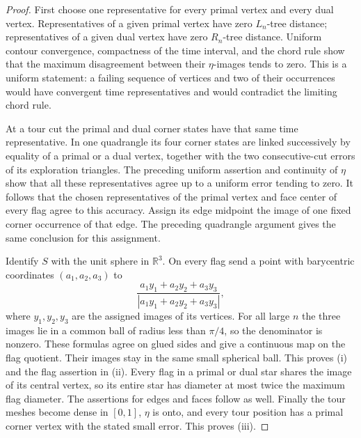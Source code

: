 \documentclass[11pt]{article}
\numberwithin{equation}{section}
\theoremstyle{definition}
\theoremstyle{remark}
\newcommand{\1}{\mathbf 1}
\begin{document}
\begin{proof}
First choose one representative for every primal vertex and every dual
vertex.  Representatives of a given primal vertex have zero
$L_n$-tree distance; representatives of a given dual vertex have zero
$R_n$-tree distance.  Uniform contour convergence, compactness of the
time interval, and the chord rule show that the maximum disagreement
between their $\eta$-images tends to zero.  This is a uniform statement:
a failing sequence of vertices and two of their occurrences would have
convergent time representatives and would contradict the limiting chord
rule.

At a tour cut the primal and dual corner states have that same time
representative.  In one quadrangle its four corner states are linked
successively by equality of a primal or a dual vertex, together with the
two consecutive-cut errors of its exploration triangles.  The preceding
uniform assertion and continuity of $\eta$ show that all these
representatives agree up to a uniform error tending to zero.  It follows
that the chosen representatives of the primal vertex and face center
of every flag agree to this accuracy.  Assign its edge midpoint the
image of one fixed corner occurrence of that edge.  The preceding
quadrangle argument gives the same conclusion for this assignment.

Identify $S$ with the unit sphere in $\mathbb R^3$.  On every flag send a point
with barycentric coordinates $(a_1,a_2,a_3)$ to
\[
 \frac{a_1 y_1+a_2 y_2+a_3 y_3}
 {|a_1 y_1+a_2 y_2+a_3 y_3|},
\]
where $y_1,y_2,y_3$ are the assigned images of its vertices.  For all
large $n$ the three images lie in a common ball of radius less than
$\pi/4$, so the denominator is nonzero.  These formulas agree on glued
sides and give a continuous map on the flag quotient.  Their images
stay in the same small spherical ball.  This proves (i) and the flag
assertion in (ii).  Every flag in a primal or dual star shares the
image of its central vertex, so its entire star has diameter at most
twice the maximum flag diameter.  The assertions for edges and faces
follow as well.  Finally the tour meshes become dense in $[0,1]$,
$\eta$ is onto, and every tour position has a primal corner vertex
with the stated small error.  This proves (iii).
\end{proof}
\end{document}
